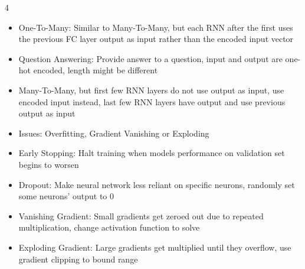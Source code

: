 \documentclass[10pt, landscape]{article}
\begin{document}
\begin{multicols*}{4}
\begin{itemize}
    \item One-To-Many: Similar to Many-To-Many, but each RNN after the first uses the previous FC layer output as input rather than the encoded input vector
    \item Question Answering: Provide answer to a question, input and output are one-hot encoded, length might be different
    \item Many-To-Many, but first few RNN layers do not use output as input, use encoded input instead, last few RNN layers have output and use previous output as input
    \item Issues: Overfitting, Gradient Vanishing or Exploding
    \item Early Stopping: Halt training when models performance on validation set begins to worsen
    \item Dropout: Make neural network less reliant on specific neurons, randomly set some neurons' output to 0
    \item Vanishing Gradient: Small gradients get zeroed out due to repeated multiplication, change activation function to solve
    \item Exploding Gradient: Large gradients get multiplied until they overflow, use gradient clipping to bound range
\end{itemize}


\end{multicols*}
\end{document}
